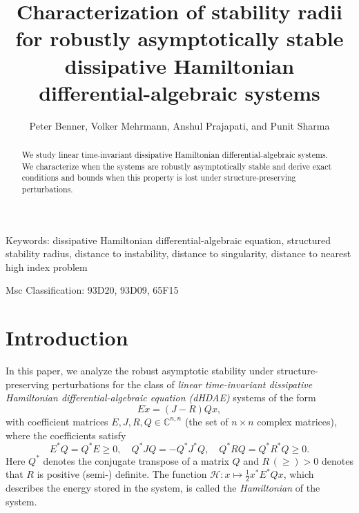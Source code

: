 \documentclass[11pt]{article}
\title{Characterization of stability radii for robustly asymptotically  stable dissipative Hamiltonian differential-algebraic systems}
\author{Peter Benner, Volker Mehrmann, Anshul Prajapati, and Punit Sharma}
\begin{document}
\maketitle

\begin{abstract}
    We study linear time-invariant dissipative Hamiltonian differential-algebraic systems.  %
    We characterize when the systems are robustly asymptotically stable and derive exact conditions and bounds when this property is lost under structure-preserving perturbations.
	\end{abstract}

Keywords: {dissipative Hamiltonian differential-algebraic equation,  structured stability radius, distance to instability, distance to singularity, distance to nearest high index problem}

Msc Classification: {93D20, 93D09, 65F15}


\section{Introduction}%
\label{sec:intro}

In this paper, we analyze the robust asymptotic stability under structure-preserving perturbations for the class of \emph{linear time-invariant dissipative Hamiltonian differential-algebraic equation (dHDAE)} systems of the form
%
\begin{equation}\label{dhdae}
    E\dot{x}=(J-R)Qx ,
\end{equation}
%
with coefficient matrices $E, J, R, Q\in \mathbb C^{n,n}$ (the  set of $n\times n$ complex matrices), where the coefficients satisfy
%
\begin{equation}\label{dhprop}
  E^*Q=Q^*E\geq 0,\quad Q^*JQ=-Q^*J^*Q,\quad Q^*RQ= Q^*R^*Q\geq 0.
\end{equation}
%
Here $Q^*$ denotes the conjugate transpose of a matrix $Q$ and $R\, (\geq)> 0$ denotes that $R$ is positive (semi-) definite.
The function $\mathcal H: x\mapsto \frac 12 x^*E^*Qx$, which describes the energy stored in the system, is called the \emph{Hamiltonian} of the system.
\end{document}
